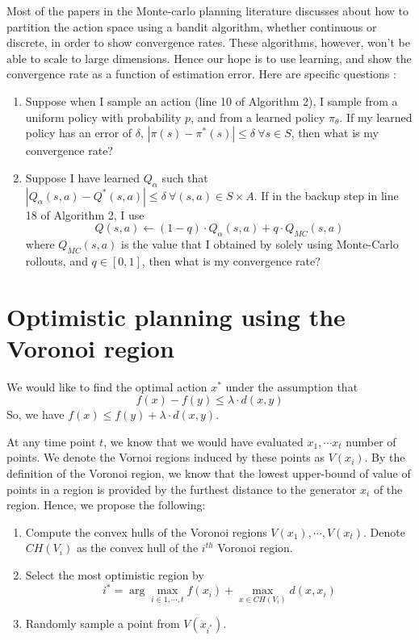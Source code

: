 \documentclass[10pt,letterpaper]{article}
\begin{document}
Most of the papers in the Monte-carlo planning literature discusses about how to partition the
action space using a bandit algorithm, whether continuous or discrete,
 in order to show convergence rates. These algorithms, however, won't be able 
to scale to large dimensions. Hence our
hope is to use learning, and show the convergence rate as a function of
estimation error.
Here are specific questions :
\begin{enumerate}
\item Suppose when I sample an action (line 10 of Algorithm 2), I sample from a uniform
policy with probability $p$, and from a learned policy $\pi_\theta$. If my
learned policy has an error of $\delta$, $|\pi(s) - \pi^*(s)|\leq \delta\ \forall s \in S$,
then what is my convergence rate?
\item Suppose I have learned $Q_{\alpha}$ such that $|Q_{\alpha}(s,a)-Q^*(s,a)|\leq \delta\ \forall (s,a) \in S \times A$.
If in the backup step in line 18 of Algorithm 2, I use
$$ Q(s,a) \leftarrow (1-q)\cdot Q_{\alpha}(s,a) + q \cdot Q_{MC}(s,a)$$ 
where $Q_{MC}(s,a)$ is the value that I obtained by solely using
Monte-Carlo rollouts, and $q\in[0,1]$, then  what is my convergence rate?
\end{enumerate}

\section{Optimistic planning using the Voronoi region}
We would like to find the optimal action $x^*$ under the assumption that 
$$ f(x) - f(y) \leq \lambda \cdot d(x,y)$$
So, we have
$ f(x) \leq f(y) + \lambda \cdot d(x,y)$.

At any time point $t$, we know that we would have evaluated $x_1,\cdots x_t$ number of points.
We denote the Vornoi regions induced by these points as $V(x_i)$. By the definition of the 
Voronoi region, we know that the lowest upper-bound of value of points in a region
is provided by the furthest distance to the 
generator $x_i$ of the region. Hence, we  propose the following:
\begin{enumerate}
\item Compute the convex hulls of the Voronoi regions $V(x_1),\cdots, V(x_t)$. Denote $CH(V_i)$ as the
convex hull of the $i^{th}$ Voronoi region.
\item Select the most optimistic region by  $$ i^* = \arg\max_{i \in {1,\cdots,t}} f(x_i) + \max_{x \in CH(V_i)} d(x,x_i)$$ 
\item Randomly sample a point from $V(x_{i^*})$.
\end{enumerate}
\end{document}
